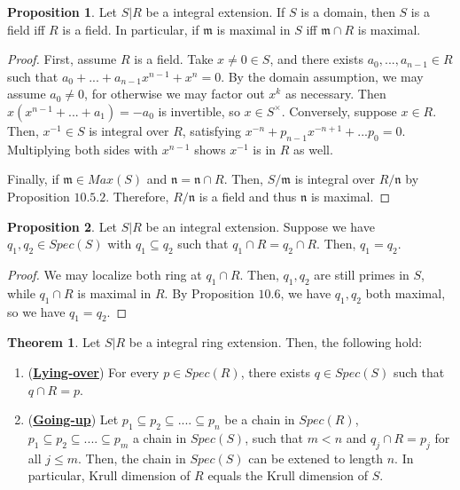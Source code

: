 \documentclass{article}
\theoremstyle{definition}
\newtheorem{theorem}{Theorem}[section]
\theoremstyle{definition}
\theoremstyle{definition}
\newtheorem{proposition}{Proposition}[section]
\theoremstyle{definition}
\theoremstyle{definition}
\theoremstyle{definition}
\theoremstyle{definition}
\begin{document}
\begin{tcolorbox}[colback=blue!5!white,colframe=blue!30!white]
\begin{proposition}
    Let $S|R$ be a integral extension. If $S$ is a domain, then $S$ is a field iff $R$ is a field. In particular, if $\mathfrak{m}$ is maximal in $S$ iff $\mathfrak{m}\cap R$ is maximal. 
\end{proposition}
\end{tcolorbox}
    \begin{proof}
        First, assume $R$ is a field. Take $x\neq 0\in S$, and there exists $a_0,...,a_{n-1}\in R$ such that $a_0+...+a_{n-1}x^{n-1}+x^n=0$. By the domain assumption, we may assume $a_0\neq 0$, for otherwise we may factor out $x^k$ as necessary. Then $x(x^{n-1}+...+a_{1})=-a_0$ is invertible, so $x\in S^{\times}$. Conversely, suppose $x\in R$. Then, $x^{-1}\in S$ is integral over $R$, satisfying $x^{-n}+p_{n-1}x^{-n+1}+...p_0=0$. Multiplying both sides with $x^{n-1}$ shows $x^{-1}$ is in $R$ as well.
    
        Finally, if $\mathfrak{m}\in Max(S)$ and $\mathfrak{n}=\mathfrak{n}\cap R$. Then, $S/\mathfrak{m}$ is integral over $R/\mathfrak{n}$ by Proposition $10.5.2$. Therefore, $R/\mathfrak{n}$ is a field and thus $\mathfrak{n}$ is maximal. 
    \end{proof}
    

\begin{tcolorbox}[colback=blue!5!white,colframe=blue!30!white]
\begin{proposition}
Let $S|R$ be an integral extension. Suppose we have $q_1,q_2\in Spec(S)$ with $q_1\subseteq q_2$ such that $q_1\cap R=q_2\cap R$. Then, $q_1=q_2$. 
\end{proposition}
\end{tcolorbox}
\begin{proof}
  We may localize both ring at $q_1\cap R$. Then, $q_1,q_2$ are still primes in $S$, while $q_1\cap R$ is maximal in $R$. By Proposition $10.6$, we have $q_1,q_2$ both maximal, so we have $q_1=q_2$.
\end{proof}

\begin{tcolorbox}[colback=red!5!white,colframe=red!30!white]
\begin{theorem}
 Let $S|R$ be a integral ring extension. Then, the following hold: 
\begin{enumerate}
    \item (\underline{\textbf{Lying-over}}) For every $p\in Spec(R)$, there exists $q\in Spec(S)$ such that $q\cap R=p$. 
    \item (\underline{\textbf{Going-up}}) Let $p_1\subseteq p_2\subseteq ....\subseteq p_n$ be a chain in $Spec(R)$, $p_1\subseteq p_2\subseteq ....\subseteq p_m$ a chain in $Spec(S)$, such that $m<n$ and $q_j\cap R=p_j$ for all $j\leq m$. Then, the chain in $Spec(S)$ can be extened to length $n$. In particular, Krull dimension of $R$ equals the Krull dimension of $S$. 
\end{enumerate}
\end{theorem}
\end{tcolorbox}
\end{document}
